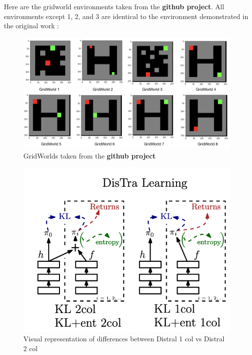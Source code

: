 \documentclass[12pt]{report}
\begin{document}
Here are the gridworld environments taken from the \textbf{github project}. All environments except 1, 2, and 3 are identical to the environment demonstrated in the original work \cite{teh2017distral}:
\begin{figure}[H]
    \center
    \includegraphics[width=0.7\linewidth]{figs/GridWorlds.png}
    \caption{GridWorlds taken from the \textbf{github project}}
    \label{fig:gridworlds}
\end{figure}
\begin{figure}[H]
    \center
    \includegraphics[width=0.45\linewidth]{figs/distral1_2_diagram.png}
    \caption{Visual representation of differences between Distral 1 col vs Distral 2 col}
    \label{fig:distral12}
\end{figure}
\end{document}
